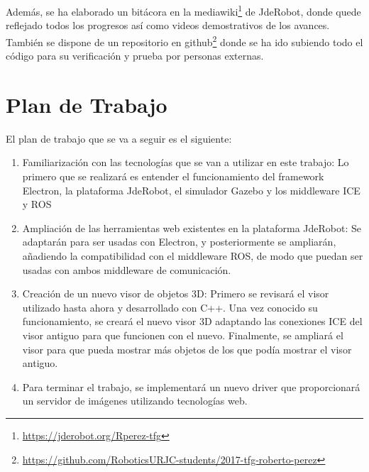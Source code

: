 Además, se ha elaborado un bitácora en la mediawiki\footnote{\url{https://jderobot.org/Rperez-tfg}} de JdeRobot, donde quede reflejado todos los progresos así como videos demostrativos de los avances. También se dispone de un repositorio en github\footnote{\url{https://github.com/RoboticsURJC-students/2017-tfg-roberto-perez}} donde se ha ido subiendo todo el código para su verificación y prueba por personas externas.

\section{Plan de Trabajo}
El plan de trabajo que se va a seguir es el siguiente:

\begin{enumerate}
\item Familiarización con las tecnologías que se van a utilizar en este trabajo: Lo primero que se realizará es entender el funcionamiento del framework Electron, la plataforma JdeRobot, el simulador Gazebo y los middleware ICE y ROS
\item Ampliación de las herramientas web existentes en la plataforma JdeRobot: Se adaptarán para ser usadas con Electron, y posteriormente se ampliarán, añadiendo la compatibilidad con el middleware ROS, de modo que puedan ser usadas con ambos middleware de comunicación.
\item Creación de un nuevo visor de objetos 3D: Primero se revisará el visor utilizado hasta ahora y desarrollado con C++. Una vez conocido su funcionamiento, se creará el nuevo visor 3D adaptando las conexiones ICE del visor antiguo para que funcionen con el nuevo. Finalmente, se ampliará el visor para que pueda mostrar más objetos de los que podía mostrar el visor antiguo.
\item Para terminar el trabajo, se implementará un nuevo driver que proporcionará un servidor de imágenes utilizando tecnologías web.
\end{enumerate}


